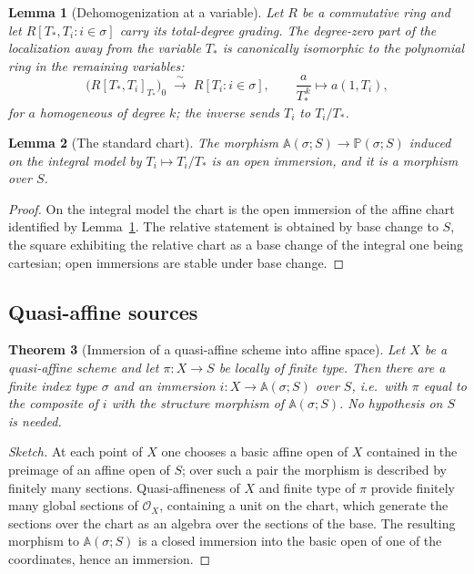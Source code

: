 \documentclass[11pt,a4paper]{article}
\theoremstyle{plain}
\newtheorem{theorem}{Theorem}[section]
\newtheorem{lemma}[theorem]{Lemma}
\theoremstyle{definition}
\theoremstyle{remark}
\newcommand{\sO}{\mathcal{O}}
\newcommand{\Aff}{\mathbb{A}}
\newcommand{\Pj}{\mathbb{P}}
\begin{document}
\begin{lemma}[Dehomogenization at a variable]
\label{lem:dehomogenization}
Let $R$ be a commutative ring and let $R[T_*,T_i : i\in\sigma]$ carry its
total-degree grading. The degree-zero part of the localization away from the
variable $T_*$ is canonically isomorphic to the polynomial ring in the
remaining variables:
\[
  \bigl(R[T_*,T_i]_{T_*}\bigr)_0 \;\xrightarrow{\ \sim\ }\; R[T_i : i\in\sigma],
  \qquad \frac{a}{T_*^{\,k}} \longmapsto a(1,T_i),
\]
for $a$ homogeneous of degree $k$; the inverse sends $T_i$ to $T_i/T_*$.
\end{lemma}

\begin{lemma}[The standard chart]
\label{lem:affine-chart}
The morphism $\Aff(\sigma;S)\to\Pj(\sigma;S)$ induced on the integral model by
$T_i\mapsto T_i/T_*$ is an open immersion, and it is a morphism over $S$.
\end{lemma}

\begin{proof}
On the integral model the chart is the open immersion of the affine chart
identified by Lemma~\ref{lem:dehomogenization}. The relative statement is
obtained by base change to $S$, the square exhibiting the relative chart as a
base change of the integral one being cartesian; open immersions are stable
under base change.
\end{proof}

\subsection{Quasi-affine sources}

\begin{theorem}[Immersion of a quasi-affine scheme into affine space]
\label{thm:04II}
Let $X$ be a quasi-affine scheme and let $\pi\colon X\to S$ be locally of
finite type. Then there are a finite index type $\sigma$ and an immersion
$i\colon X\to\Aff(\sigma;S)$ over $S$, i.e.\ with $\pi$ equal to the composite
of $i$ with the structure morphism of $\Aff(\sigma;S)$. No hypothesis on $S$ is
needed.
\end{theorem}

\begin{proof}[Sketch]
At each point of $X$ one chooses a basic affine open of $X$ contained in the
preimage of an affine open of $S$; over such a pair the morphism is described
by finitely many sections. Quasi-affineness of $X$ and finite type of $\pi$
provide finitely many global sections of $\sO_X$, containing a unit on the
chart, which generate the sections over the chart as an algebra over the
sections of the base. The resulting morphism to $\Aff(\sigma;S)$ is a closed
immersion into the basic open of one of the coordinates, hence an immersion.
\end{proof}
\end{document}
